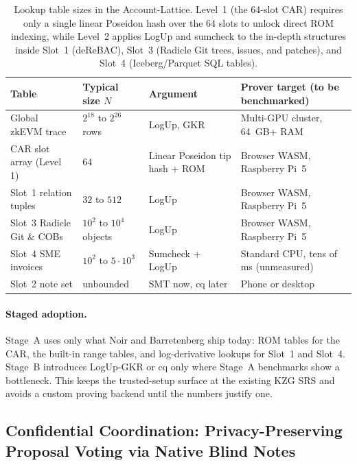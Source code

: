 \documentclass[a4paper,11pt,twoside,parskip=half-,headings=small]{scrartcl}
\begin{document}
\begin{table}[H]
\centering
\small
\begin{tabularx}{\textwidth}{l p{2.8cm} p{3.2cm} X}
\toprule
\textbf{Table} & \textbf{Typical size $N$} & \textbf{Argument} & \textbf{Prover target (to be benchmarked)} \\
\midrule
Global zkEVM trace & $2^{18}$ to $2^{26}$ rows & LogUp, GKR & Multi-GPU cluster, 64~GB+ RAM \\
CAR slot array (Level 1) & $64$ & Linear Poseidon tip hash + ROM & Browser WASM, Raspberry Pi~5 \\
Slot~1 relation tuples & $32$ to $512$ & LogUp & Browser WASM, Raspberry Pi~5 \\
Slot~3 Radicle Git \& COBs & $10^2$ to $10^4$ objects & LogUp & Browser WASM, Raspberry Pi~5 \\
Slot~4 SME invoices & $10^2$ to $5{\cdot}10^3$ & Sumcheck + LogUp & Standard CPU, tens of ms (unmeasured) \\
Slot~2 note set & unbounded & SMT now, cq later & Phone or desktop \\
\bottomrule
\end{tabularx}
\caption{Lookup table sizes in the Account-Lattice. Level~1 (the 64-slot CAR) requires only a single linear Poseidon hash over the 64 slots to unlock direct ROM indexing, while Level~2 applies LogUp and sumcheck to the in-depth structures inside Slot~1 (deReBAC), Slot~3 (Radicle Git trees, issues, and patches), and Slot~4 (Iceberg/Parquet SQL tables).}
\label{tab:lookup_complexity_shift}
\end{table}

\paragraph{Staged adoption.}
Stage~A uses only what Noir and Barretenberg ship today: ROM tables for the CAR, the built-in range tables, and log-derivative lookups for Slot~1 and Slot~4. Stage~B introduces LogUp-GKR or cq only where Stage~A benchmarks show a bottleneck. This keeps the trusted-setup surface at the existing KZG SRS and avoids a custom proving backend until the numbers justify one.

\subsection{Confidential Coordination: Privacy-Preserving Proposal Voting via Native Blind Notes}
\label{sec:confidential_voting}
\end{document}
